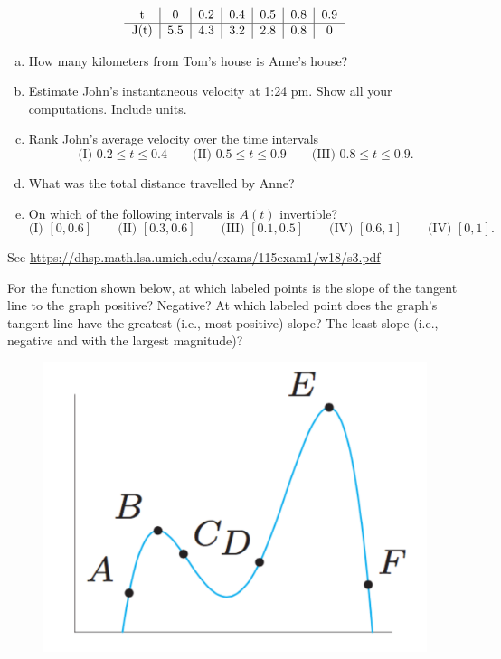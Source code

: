 \documentclass[11pt]{exam}
\begin{document}
\begin{questions}
\begin{minipage}{0.5\linewidth}
\end{minipage}
\begin{minipage}{0.5\linewidth}
$$\begin{tabular}{c|c|c|c|c|c|c} t & 0 & 0.2 & 0.4 & 0.5 & 0.8 & 0.9 \\ \hline J(t) & 5.5 & 4.3 & 3.2 & 2.8 & 0.8 & 0 \end{tabular}$$
\end{minipage}
\begin{enumerate}[(a)]
\item How many kilometers from Tom’s house is Anne's house?
\item Estimate John's instantaneous velocity at 1:24 pm. Show all your computations. Include units.
\item Rank John's average velocity over the time intervals
$$\textrm{(I) } 0.2 \leqslant t \leqslant 0.4 \qquad \textrm{(II) } 0.5 \leqslant t \leqslant 0.9 \qquad \textrm{(III) } 0.8 \leqslant t \leqslant 0.9.$$
\item What was the total distance travelled by Anne?
\item On which of the following intervals is $A(t)$ invertible?
$$\textrm{(I) } [0,0.6] \qquad \textrm{(II) } [0.3,0.6] \qquad \textrm{(III) } [0.1,0.5] \qquad \textrm{(IV) } [0.6,1] \qquad \textrm{(IV) } [0,1].$$
\end{enumerate}
\begin{solution}
  See \href{https://dhsp.math.lsa.umich.edu/exams/115exam1/w18/s3.pdf}{https://dhsp.math.lsa.umich.edu/exams/115exam1/w18/s3.pdf}
\end{solution}
\question 
For the function shown below, at which labeled points is the slope of
the tangent line to the graph positive? Negative? At which labeled
point does the graph's tangent line have the greatest 
(i.e., most positive) slope? The least slope (i.e., negative and with the largest magnitude)?
\begin{figure}[htp]
		\centering
		\includegraphics[scale=0.4]{Figures/fig4.pdf}

\end{figure}
\end{questions}
\end{document}

